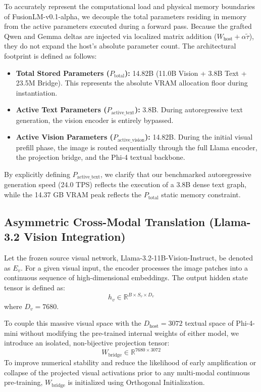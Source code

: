 \documentclass[11pt]{article}
\begin{document}
To accurately represent the computational load and physical memory boundaries of FusionLM-v0.1-alpha, we decouple the total parameters residing in memory from the active parameters executed during a forward pass. Because the grafted Qwen and Gemma deltas are injected via localized matrix addition ($W_{\text{host}} + \alpha \tilde{\tau}$), they do not expand the host's absolute parameter count. The architectural footprint is defined as follows:

\begin{itemize}
    \item \textbf{Total Stored Parameters ($P_{\text{total}}$):} 14.82B (11.0B Vision + 3.8B Text + 23.5M Bridge). This represents the absolute VRAM allocation floor during instantiation.
    \item \textbf{Active Text Parameters ($P_{\text{active\_text}}$):} 3.8B. During autoregressive text generation, the vision encoder is entirely bypassed.
    \item \textbf{Active Vision Parameters ($P_{\text{active\_vision}}$):} 14.82B. During the initial visual prefill phase, the image is routed sequentially through the full Llama encoder, the projection bridge, and the Phi-4 textual backbone.
\end{itemize}

By explicitly defining $P_{\text{active\_text}}$, we clarify that our benchmarked autoregressive generation speed (24.0 TPS) reflects the execution of a 3.8B dense text graph, while the 14.37 GB VRAM peak reflects the $P_{\text{total}}$ static memory constraint.

\subsection{Asymmetric Cross-Modal Translation (Llama-3.2 Vision Integration)}
Let the frozen source visual network, Llama-3.2-11B-Vision-Instruct, be denoted as $E_{v}$. For a given visual input, the encoder processes the image patches into a continuous sequence of high-dimensional embeddings. The output hidden state tensor is defined as:
$$ h_{v} \in \mathbb{R}^{B \times S_{v} \times D_{v}} $$
where $D_{v} = 7680$.

To couple this massive visual space with the $D_{\text{host}} = 3072$ textual space of Phi-4-mini without modifying the pre-trained internal weights of either model, we introduce an isolated, non-bijective projection tensor:
$$ W_{\text{bridge}} \in \mathbb{R}^{7680 \times 3072} $$
To improve numerical stability and reduce the likelihood of early amplification or collapse of the projected visual activations prior to any multi-modal continuous pre-training, $W_{\text{bridge}}$ is initialized using Orthogonal Initialization. 
\end{document}
